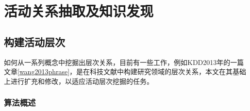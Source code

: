 \chapter{活动关系抽取及知识发现}
\section{构建活动层次}
如何从一系列概念中挖掘出层次关系，目前有一些工作，例如KDD2013年的一篇文章\ref{wang2013phrase}，是在科技文献中构建研究领域的层次关系，本文在其基础上进行扩充和修改，以适应活动层次挖掘的任务。

\subsection{算法概述}

